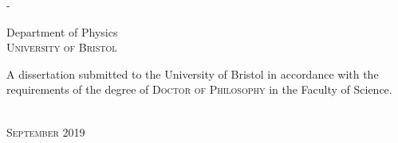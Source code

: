 \begin{titlingpage}
\begin{SingleSpace}
\begin{adjustwidth*}{\unitlength}{-\unitlength}
\begin{center}
\vspace{30mm}
{\large Department of Physics\\
\textsc{University of Bristol}}\\
\vspace{15mm}
\begin{minipage}{8.5cm}
A dissertation submitted to the University of Bristol in accordance with the requirements of the degree of \textsc{Doctor of Philosophy} in the Faculty of Science.
\end{minipage}\\
\vspace{9mm}
{\large\textsc{September 2019}}
\vspace{12mm}
\end{center}
\end{adjustwidth*}
\end{SingleSpace}
\end{titlingpage}